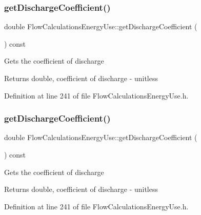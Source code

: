 \subsubsection{\texorpdfstring{get\+Discharge\+Coefficient()}{getDischargeCoefficient()}\hspace{0.1cm}{\footnotesize\ttfamily [2/3]}}
{\footnotesize\ttfamily double Flow\+Calculations\+Energy\+Use\+::get\+Discharge\+Coefficient (\begin{DoxyParamCaption}{ }\end{DoxyParamCaption}) const\hspace{0.3cm}{\ttfamily [inline]}}

Gets the coefficient of discharge

\begin{DoxyReturn}{Returns}
double, coefficient of discharge -\/ unitless 
\end{DoxyReturn}


Definition at line 241 of file Flow\+Calculations\+Energy\+Use.\+h.

\mbox{\label{class_flow_calculations_energy_use_a28033765df3a220b5c7d75e34fd95c43}} 
\subsubsection{\texorpdfstring{get\+Discharge\+Coefficient()}{getDischargeCoefficient()}\hspace{0.1cm}{\footnotesize\ttfamily [3/3]}}
{\footnotesize\ttfamily double Flow\+Calculations\+Energy\+Use\+::get\+Discharge\+Coefficient (\begin{DoxyParamCaption}{ }\end{DoxyParamCaption}) const\hspace{0.3cm}{\ttfamily [inline]}}

Gets the coefficient of discharge

\begin{DoxyReturn}{Returns}
double, coefficient of discharge -\/ unitless 
\end{DoxyReturn}


Definition at line 241 of file Flow\+Calculations\+Energy\+Use.\+h.

\mbox{\label{class_flow_calculations_energy_use_a6b892e984bd09e821cb642f8f8efd221}} 
